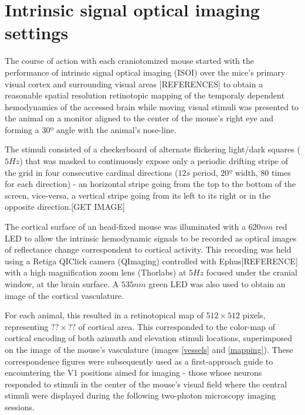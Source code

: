 \section{Intrinsic signal optical imaging settings}
\label{sec:Intrinsic-signal-optical-imaging-settings}

The course of action with each craniotomized mouse started with the performance of intrinsic signal optical imaging (ISOI) over the mice's primary visual cortex and surrounding visual areas [REFERENCES] to obtain a reasonable spatial resolution retinotopic mapping of the temporaly dependent hemodynamics of the accessed brain while moving visual stimuli was presented to the animal on a monitor aligned to the center of the mouse's right eye and forming a $30º$ angle with the animal's nose-line.

The stimuli consisted of a checkerboard of alternate flickering light/dark squares ($5 Hz$) that was masked to continuously expose only a periodic drifting stripe of the grid in four consecutive cardinal directions ($12 s$ period, $20º$ width, 80 times for each direction) - an horizontal stripe going from the top to the bottom of the screen, vice-versa, a vertical stripe going from its left to its right or in the opposite direction.[GET IMAGE]

The cortical surface of an head-fixed mouse was illuminated with a $620 nm$ red LED to allow the intrinsic hemodynamic signals to be recorded as optical images of reflectance change correspondent to cortical activity. This recording was held using a Retiga QIClick camera (QImaging) controlled with Ephus[REFERENCE] with a high magnification zoom lens (Thorlabs) at $5 Hz$ focused under the cranial window, at the brain surface. A $535 nm$ green LED was also used to obtain an image of the cortical vasculature.

For each animal, this resulted in a retinotopical map of $512 \times 512$ pixels, representing $?? \times ??$ of cortical area. This corresponded to the color-map of cortical encoding of both azimuth and elevation stimuli locations, superimposed on the image of the mouse's vasculature (images \ref{vessels} and \ref{mapping}). These correspondence figures were subsequently used as a first-approach guide to encountering the V1 positions aimed for imaging - those whose neurons responded to stimuli in the center of the mouse's visual field where the central stimuli were displayed during the following two-photon microscopy imaging sessions.


